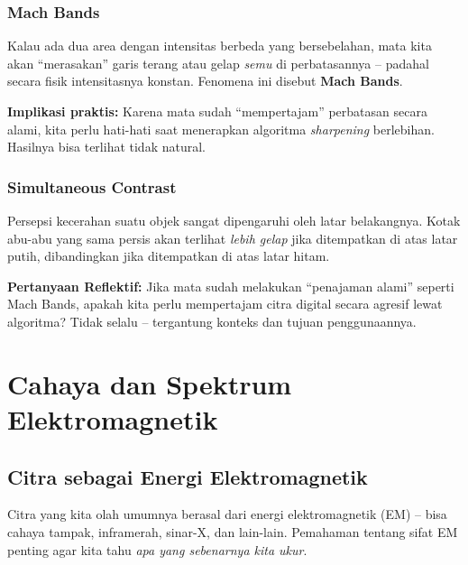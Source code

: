 \documentclass[12pt,a4paper]{article}
\begin{document}
\subsubsection{Mach Bands}
 
Kalau ada dua area dengan intensitas berbeda yang bersebelahan, mata kita akan
``merasakan'' garis terang atau gelap \textit{semu} di perbatasannya -- padahal secara
fisik intensitasnya konstan. Fenomena ini disebut \textbf{Mach Bands}.
 
\begin{tipbox}
  \textbf{Implikasi praktis:} Karena mata sudah ``mempertajam'' perbatasan secara alami,
  kita perlu hati-hati saat menerapkan algoritma \textit{sharpening} berlebihan. Hasilnya
  bisa terlihat tidak natural.
\end{tipbox}
 
\subsubsection{Simultaneous Contrast}
 
Persepsi kecerahan suatu objek sangat dipengaruhi oleh latar belakangnya. Kotak
abu-abu yang sama persis akan terlihat \textit{lebih gelap} jika ditempatkan di atas
latar putih, dibandingkan jika ditempatkan di atas latar hitam.
 
\begin{notebox}
  \textbf{Pertanyaan Reflektif:} Jika mata sudah melakukan ``penajaman alami'' seperti
  Mach Bands, apakah kita perlu mempertajam citra digital secara agresif lewat algoritma?
  Tidak selalu -- tergantung konteks dan tujuan penggunaannya.
\end{notebox}
 
\section{Cahaya dan Spektrum Elektromagnetik}
\label{sec:em}
 
\subsection{Citra sebagai Energi Elektromagnetik}
 
Citra yang kita olah umumnya berasal dari energi elektromagnetik (EM) -- bisa cahaya
tampak, inframerah, sinar-X, dan lain-lain. Pemahaman tentang sifat EM penting agar
kita tahu \textit{apa yang sebenarnya kita ukur}.
 
\end{document}

